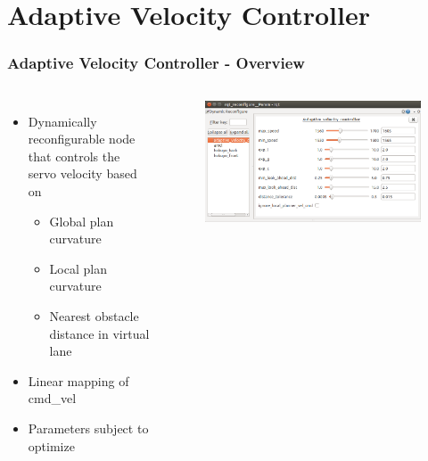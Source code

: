 \documentclass[noshadow]{LSRslides}
\begin{document}
\section{Adaptive Velocity Controller}
\begin{frame}
\frametitle{Adaptive Velocity Controller  - Overview}


\begin{columns}
	
\begin{itemize}
\small
	\item Dynamically reconfigurable node that controls the servo velocity based on
	\begin{itemize}
	\item Global plan curvature
	\item Local plan curvature
	\item Nearest obstacle distance in virtual lane
	\end{itemize}
	\item Linear mapping of cmd\_vel
	\item Parameters subject to optimize

\end{itemize}

\begin{figure}
      \includegraphics[scale=0.3]{adaptive_velocity_rqt.png} 
   \end{figure}


\end{columns}
\end{frame}
\end{document}
